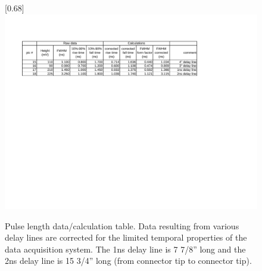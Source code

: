 \begin{figure}
\scalebox{0.68}[0.68]{
\includegraphics[bb=10 400 605 550]
{delay_lines/delay_lines.pdf}
}
\caption[Pulse length data/calculation table]{Pulse length data/calculation table. Data resulting from various delay lines are corrected for the limited temporal properties of the data acquisition system. The 1ns delay line is 7 7/8'' long and the 2ns delay line is 15 3/4'' long (from connector tip to connector tip).}
\label{delay lines}
\end{figure}
